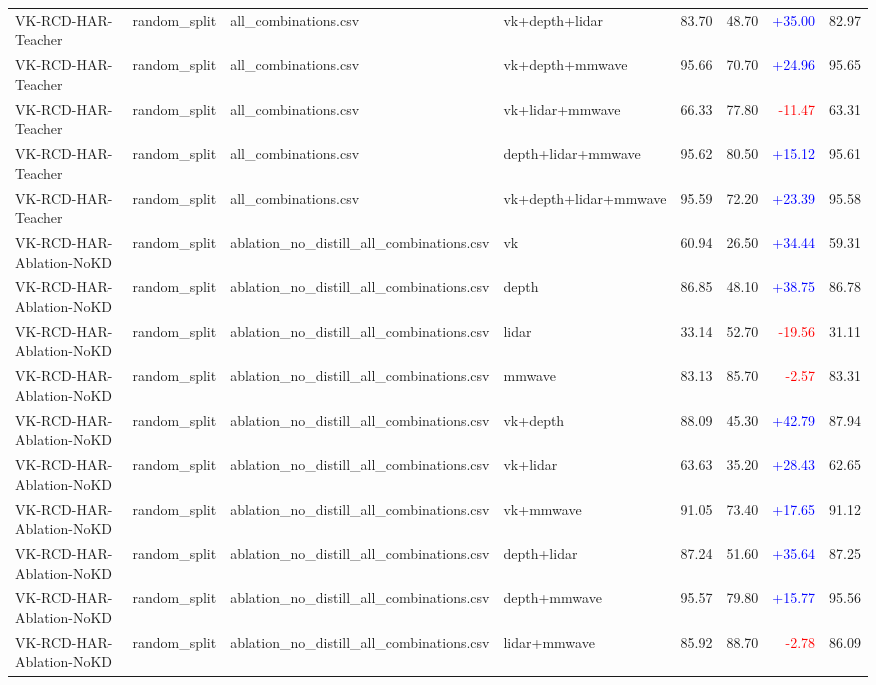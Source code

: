 \documentclass[10pt]{article}
\begin{document}
\begin{longtable}{llllrrrr}
VK-RCD-HAR-Teacher & random\_split & all\_combinations.csv & vk+depth+lidar & 83.70 & 48.70 & \textcolor{blue}{+35.00} & 82.97\\
VK-RCD-HAR-Teacher & random\_split & all\_combinations.csv & vk+depth+mmwave & 95.66 & 70.70 & \textcolor{blue}{+24.96} & 95.65\\
VK-RCD-HAR-Teacher & random\_split & all\_combinations.csv & vk+lidar+mmwave & 66.33 & 77.80 & \textcolor{red}{-11.47} & 63.31\\
VK-RCD-HAR-Teacher & random\_split & all\_combinations.csv & depth+lidar+mmwave & 95.62 & 80.50 & \textcolor{blue}{+15.12} & 95.61\\
VK-RCD-HAR-Teacher & random\_split & all\_combinations.csv & vk+depth+lidar+mmwave & 95.59 & 72.20 & \textcolor{blue}{+23.39} & 95.58\\
VK-RCD-HAR-Ablation-NoKD & random\_split & ablation\_no\_distill\_all\_combinations.csv & vk & 60.94 & 26.50 & \textcolor{blue}{+34.44} & 59.31\\
VK-RCD-HAR-Ablation-NoKD & random\_split & ablation\_no\_distill\_all\_combinations.csv & depth & 86.85 & 48.10 & \textcolor{blue}{+38.75} & 86.78\\
VK-RCD-HAR-Ablation-NoKD & random\_split & ablation\_no\_distill\_all\_combinations.csv & lidar & 33.14 & 52.70 & \textcolor{red}{-19.56} & 31.11\\
VK-RCD-HAR-Ablation-NoKD & random\_split & ablation\_no\_distill\_all\_combinations.csv & mmwave & 83.13 & 85.70 & \textcolor{red}{-2.57} & 83.31\\
VK-RCD-HAR-Ablation-NoKD & random\_split & ablation\_no\_distill\_all\_combinations.csv & vk+depth & 88.09 & 45.30 & \textcolor{blue}{+42.79} & 87.94\\
VK-RCD-HAR-Ablation-NoKD & random\_split & ablation\_no\_distill\_all\_combinations.csv & vk+lidar & 63.63 & 35.20 & \textcolor{blue}{+28.43} & 62.65\\
VK-RCD-HAR-Ablation-NoKD & random\_split & ablation\_no\_distill\_all\_combinations.csv & vk+mmwave & 91.05 & 73.40 & \textcolor{blue}{+17.65} & 91.12\\
VK-RCD-HAR-Ablation-NoKD & random\_split & ablation\_no\_distill\_all\_combinations.csv & depth+lidar & 87.24 & 51.60 & \textcolor{blue}{+35.64} & 87.25\\
VK-RCD-HAR-Ablation-NoKD & random\_split & ablation\_no\_distill\_all\_combinations.csv & depth+mmwave & 95.57 & 79.80 & \textcolor{blue}{+15.77} & 95.56\\
VK-RCD-HAR-Ablation-NoKD & random\_split & ablation\_no\_distill\_all\_combinations.csv & lidar+mmwave & 85.92 & 88.70 & \textcolor{red}{-2.78} & 86.09\\

\end{longtable}
\end{document}
